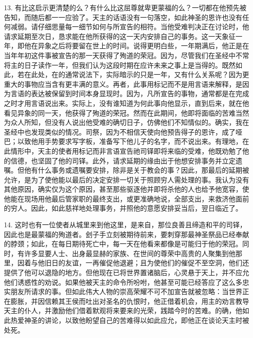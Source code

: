 13. 有比这启示更清楚的么？有什么比这屈尊就卑更蒙福的么？一切都在他预先被告知，而随后都一一应验了。天主的话语没有一句落空，如此神圣的恩许也没有任何减弱。请仔细思量每一细节如何与所宣告的相符。当他受难判决正在讨论时，他请求延期至次日，恳求能在他所获得的这一天内安排自己的事务。这一天象征一年，即他在异象之后将要留在世上的时间。说得更明白些，一年期满后，他正是在当年年初这件事被宣告的那一天获得了殉道的荣冠。因为，尽管我们在圣经中不常将主的日子读作一年，但我们认为这段时期在应许未来之事上是当得的。既然如此，若在此处，在的通常说法下，实际暗示的只是一年，又有什么关系呢？因为更重大的事物应当含有更丰满的意义。再者，此事用标记而不是用言语来解释，是因为言语的表达被保留到时间本身显现时。因为，凡所宣告的事物，通常都是在完成之时才用言语说出来。实际上，没有谁知道为何此事向他显示，直到后来，就在他看见异象的同一天，他获得了殉道的荣冠。然而在此期间，他即将面临的苦难当然为众人所知，但没有人说出他受难的确切日子，仿佛他们不知情似的。确实，我在圣经中也发现类似的情况。司祭，因为不相信天使向他预告得子的恩许，成了哑巴；以致他用手势要求写字板，准备写下他儿子的名字，而不说出来。有理地，在此情形中，天主的使者用标记而非言语宣告祂司铎即将来临的受难，他既劝勉了他的信德，也坚固了他的司铎。此外，请求延期的缘由出于他想安排事务并立定遗嘱。但他有什么事务或遗嘱要安排，除非是关于教会的事？因此，那最后的延期被允许，是为了使他能以最后的决定安排一切关于照顾穷人需处理的事。我认为没有其他原因，确实仅为这个原因，甚至那些驱逐他并即将杀他的人也给予他宽容，使他能在现场用他最后管家职的最终支出，或更准确地说，全部支出，来救济他面前的穷人。因此，如此慈祥地处理事务，并照他的意愿安排妥当后，翌日临近了。\par

14. 这时也有一位使者从城里来到他这里，是来自，那位良善且缔造和平的司铎，因此也是最蒙福的殉道者。刽子手立刻被期待前来，要刺穿那最神圣祭品已经奉献的脖颈；如此，在每日期待死亡中，每一天在他看来都像是可能归于他的荣冠。同时，有许多显要人士、出身最显赫的家族、在世间的尊荣中高贵的人聚集到他那里，因着与他旧日的友谊，一再催促他退避；且为使他们的催促不至空洞，他们还提供了他可以退隐的地方。但他现在已将世界置诸脑后，心灵悬于天上，并不应允他们诱惑性的劝说。如果他被天主的命令所吩咐，他甚至可能已经答应了这么多忠实朋友所请求的事。但如此伟大人物的崇高荣耀不可不加宣告就被忽略：当世界正在膨胀，并因信赖其王侯而吐出对圣名的仇恨时，他正借着机会，用主的劝言教导天主的仆人，并激励他们借着默观将来要来的光荣，践踏今时的苦难。的确，他如此热爱神圣的讲论，以致他盼望自己的苦难得以如此应允，即他正在谈论天主时被处死。\par

